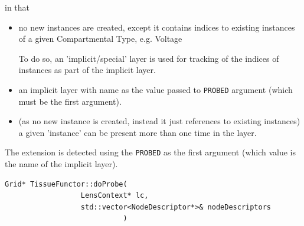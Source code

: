in that
\begin{itemize}
  \item no new instances are created, except it contains indices to existing
  instances of a given Compartmental Type, e.g. Voltage

To do so, an 'implicit/special' layer is used for tracking of the indices of
instances as part of the implicit layer.
 
  \item an implicit layer with name as the value passed to \verb!PROBED!
  argument (which must be the first argument).
  
  \item (as no new instance is created, instead it just references to existing
  instances) a given 'instance' can be present more than one time in the layer.

\end{itemize}

The extension is detected using the \verb!PROBED! as the first argument (which
value is the name of the implicit layer).
\begin{verbatim}
Grid* TissueFunctor::doProbe(
                  LensContext* lc,
                  std::vector<NodeDescriptor*>& nodeDescriptors
                            )
\end{verbatim}




